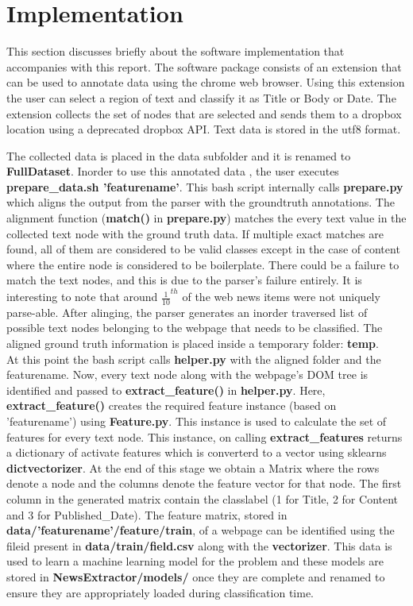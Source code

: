 \documentclass{article} %
\begin{document}


\section{Implementation}
\label{sec:software}
This section discusses briefly about the software implementation \cite{gowthamrangarajan:2016} that accompanies with this report. The software package consists of an extension that can be used to annotate data using the chrome web browser. Using this extension the user can select a region of text and classify it as Title or Body or Date. The extension collects the set of nodes that are selected and sends them to  a dropbox location using a deprecated dropbox API. Text data is stored in the utf8 format.

The collected data is placed in the data subfolder and it is renamed to \textbf{FullDataset}. Inorder to use this annotated data , the user executes \textbf{prepare\_data.sh 'featurename'}. This bash script internally calls \textbf{prepare.py} which aligns the output from the parser with the groundtruth annotations. The alignment function (\textbf{match()} in \textbf{prepare.py}) matches the every text value in the collected text node with the ground truth data. If multiple exact matches are found, all of them are considered to be valid classes except in the case of content where the entire node is considered to be boilerplate. There could be a failure to match the text nodes,  and this is due to the parser's failure entirely. It is interesting to note that around $\frac{1}{10}^{th}$ of the web news items were not uniquely parse-able. After alinging, the parser generates an inorder traversed list of possible text nodes belonging to the webpage that needs to be classified. The aligned ground truth information is placed inside a temporary folder: \textbf{temp}.\\

At this point the bash script calls \textbf{helper.py} with the aligned folder and the featurename. Now, every text node along with the webpage's DOM tree is identified and passed to  \textbf{extract\_feature()} in \textbf{helper.py}. Here, \textbf{extract\_feature()} creates the required feature instance (based on 'featurename') using \textbf{Feature.py}. This instance is used to calculate the set of features for every text node. This instance, on calling \textbf{extract\_features} returns a dictionary of activate features which is converterd to a vector using sklearns \textbf{dictvectorizer}.  At the end of this stage we obtain a Matrix where the rows denote a node and the columns denote the feature vector for that node. The first column in the generated matrix contain the classlabel (1 for Title, 2 for Content and 3 for Published\_Date). The feature matrix, stored in \textbf{data/'featurename'/feature/train}, of a webpage can be identified using the fileid present in \textbf{data/train/field.csv} along with the \textbf{vectorizer}. This data is used to learn a machine learning model for the problem and these models are stored in \textbf{NewsExtractor/models/} once they are complete and renamed to ensure they are appropriately loaded during classification time. 
\end{document}

